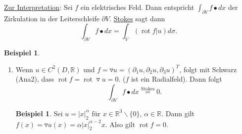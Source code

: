 \documentclass[a4paper]{report}
\newcommand{\R}{\mathbb{R}}
\newcommand{\jlabel}[1]{\label{j_#1}}
\newcommand{\jshortlink}[1]{\jhyperref{#1}{\text{#1}}}
\newcommand{\jhyperref}[2]{\hyperref[j_#1]{#2}}
\newcommand{\jlink}[1]{\jhyperref{#1}{#1}}
\newcommand{\rot}{\mathop{\mathrm{{rot}}}}
\theoremstyle{plain}
\theoremstyle{definition}
\newtheorem{expl}[thm]{Beispiel}
\newtheorem*{expl*}{Beispiel}
\begin{document}
{{{{\uline{Zur Interpretation}: Sei $f$ ein elektrisches Feld. Dann entspricht $\int_{\partial V} f \bullet dx$ der Zirkulation in der Leiterschleife $\partial V$. \jlink{Stokes} sagt dann
\[
    \int_{\partial V} f \bullet dx = \int_V (\rot f | u)d\sigma.
\]

\jlabel{Bsp 4.23}
\begin{expl}
    \begin{enumerate}
        \item 
            \jlabel{Bsp 4.23a)}
            Wenn $u \in C^2(D, \R)$ und $f = \triangledown u = (\partial_1 u, \partial_2 u, \partial_3 u)^T$, folgt mit Schwarz (Ana2), dass $\rot f = \rot \triangledown u = 0$. ($f$ ist ein Radialfeld). Dann folgt
            \[
                \int_{\partial V} f \bullet dx \overset{\jshortlink{Stokes}}{=} 0.
            \]
            \begin{expl*}
                Sei $u = |x|_2^\alpha$ für $x\in \R^3\backslash \{0\}$, $\alpha \in \R$. Dann gilt $f(x) = \triangledown u(x) = \alpha |x|_2^{\alpha-2}x$. Also gilt $\rot f = 0$.
            \end{expl*}
            

\end{enumerate}
\end{expl}}}}}
\end{document}
